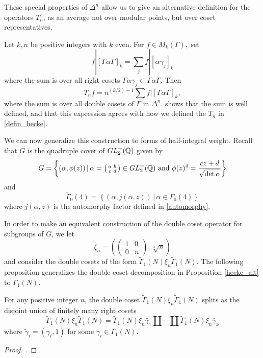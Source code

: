\documentclass[12pt, a4paper]{report}
\begin{document}
These special properties of $\Delta^n$ allow us to give an alternative
definition for the operators $T_n$, as an average not over modular points, but
over coset representatives.

\begin{defn}
  Let $k, n$ be positive integers with $k$ even. For $f \in M_k(\Gamma),$ set
  \[f | [\Gamma \alpha \Gamma]_k = \sum\limits_j f | [\alpha \gamma_j]_k\] where the sum
  is over all right cosets $\Gamma \alpha \gamma_j \subset \Gamma \alpha
  \Gamma.$ Then
  \[T_n f = n^{(k/2)-1} \sum f | [\Gamma \alpha \Gamma]_k,\]
  where the sum is over all double cosets of $\Gamma$ in $\Delta^n.$
  \cite[Chapter III-5, Page 167]{koblitz} shows that the sum is well defined,
  and that this expression agrees with
  how we defined the $T_n$ in \autoref{defin_hecke}.
\end{defn}

We can now generalize this construction to forms of half-integral weight. Recall
that $G$ is the quadruple cover of $GL_2^+({\mathbb Q})$ given by
\[G = \left\{ (\alpha, \phi(z)) \, | \, \alpha = \left(
      \begin{smallmatrix}
        a & b \\ c & d
      \end{smallmatrix}
    \right) \in GL_2^+({\mathbb Q})
    \text{ and } \phi(z)^4 = \frac{cz+d}{\sqrt{\det \alpha}} \right\}\]
and
\[\tilde{\Gamma}_0(4) = \left\{ (\alpha, j(\alpha,z)) \, | \, \alpha \in
    \Gamma_0(4) \right\}\]
where $j(\alpha,z)$ is the automorphy factor defined in \autoref{automorphy}.

In order to make an equivalent construction of the double coset operator for
subgroups of $G$, we let
\[\xi_n = \left( \left(
      \begin{smallmatrix}
        1 & 0 \\ 0 & n
      \end{smallmatrix}
    \right), \sqrt[4]{n} \right)\]
and consider the double cosets of the form
$\tilde{\Gamma}_1(N) \xi_n \tilde{\Gamma}_1(N)$. The following proposition
generalizes the double coset decomposition in Proposition \autoref{hecke_alt}
to $\tilde{\Gamma}_1(N).$

\begin{prop} \label{hecke_gen}
  For any positive integer $n$, the double coset
  $\tilde{\Gamma}_1(N) \xi_n \tilde{\Gamma}_1(N)$ splits as the disjoint union
  of finitely many right cosets
  $$\tilde{\Gamma}_1(N) \xi_n \tilde{\Gamma}_1(N) =
  \tilde{\Gamma}_1(N) \xi_n \tilde{\gamma_1} \amalg \cdots \amalg
  \tilde{\Gamma}_1(N) \xi_n \tilde{\gamma_k}$$
  where $\tilde{\gamma}_i = (\gamma_i, 1)$ for some $\gamma_i \in \Gamma_1(N).$ 
\end{prop}
\begin{proof}
  \cite[See][Chapter IV-3, Pages 203-204]{koblitz}.
\end{proof}
\end{document}

